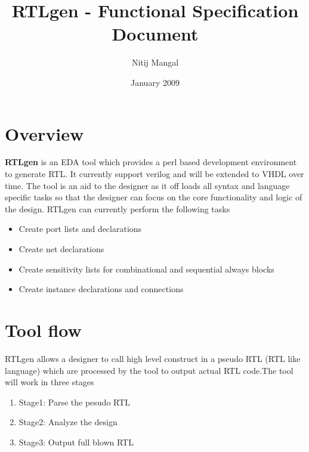 \documentclass[11pt]{article}
\begin{document}
\title{RTLgen - Functional Specification Document}
\author{Nitij Mangal}
\date{January 2009}
\maketitle

\section{Overview}
\textbf{RTLgen} is an EDA tool which provides a perl based development environment to generate RTL. It currently support verilog and will be extended to VHDL over time. The tool is an aid to the designer as it off loads all syntax and language specific tasks so that the designer can focus on the core functionality and logic of the design. RTLgen can currently perform the following tasks
\begin{itemize}
	\item Create port lists and declarations
	\item Create net declarations
	\item Create sensitivity lists for combinational and sequential always blocks
	\item Create instance declarations and connections
\end{itemize}

\section{Tool flow}
RTLgen allows a designer to call high level construct in a pseudo RTL (RTL like language) which are processed by the tool to output actual RTL code.The tool will work in three stages
\begin{enumerate}
	\item Stage1: Parse the pesudo RTL
	\item Stage2: Analyze the design
	\item Stage3: Output full blown RTL
\end{enumerate}
\end{document}
